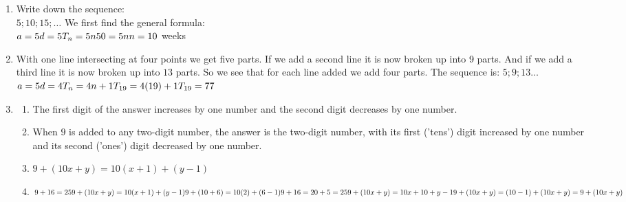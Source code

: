 \begin{eocsolutions}{}
{\begin{enumerate}[itemsep=5pt, label=\textbf{\arabic*}. ]
\begin{enumerate}[noitemsep, label=\textbf{(\alph*)} ]
  \item The first term is 4 since this is the number of matches needed for 1 square.
  \item The common difference between the terms is $3$. ($7 -4 = 3$ ; $10 - 7 = 3$)
  \item 
$%
T_n = 3n + 1$
  \item $T_25 = 3(25) + 1 \\
= 76$
  \end{enumerate}   
\item Write down the sequence:\\
$5 ; 10 ; 15 ; \ldots$
We first find the general formula:\\
$a = 5\\
d = 5\\
T_n = 5n  \\
50 = 5n \\
n = 10 $ weeks
\item With one line intersecting at four points we get five parts. If we add a second line it is now broken up into 9 parts. And if we add a third line it is now broken up into $13$ parts. So we see that for each line added we add four parts. The sequence is: $5 ; 9 ; 13 \ldots$\\
$a = 5\\
d = 4\\
T_n = 4n + 1  \\
T_{19} = 4(19) + 1 \\
T_{19} = 77 $
\item 
  \begin{enumerate}[noitemsep, label=\textbf{(\alph*)} ]
  \item The first digit of the answer increases by one number and the second digit decreases by one number.
  \item When $9$ is added to any two-digit number, the answer is the two-digit number, with its first ('tens') digit increased by one number and its second ('ones') digit decreased by one number.
  \item $9 + (10x + y) = 10(x+1)+(y-1)$
  \item $9 + 16 = 25\\
9 + (10x + y) = 10(x + 1) + (y-1)\\
9 + (10 + 6) = 10(2) + (6-1)\\
9 + 16 = 20 + 5 = 25\\
9 + (10x + y) = 10x + 10 + y - 1\\
9 + (10x + y) = (10 - 1) + (10x + y) 
= 9 + (10x + y)$
  \end{enumerate}
\end{enumerate}}
\end{eocsolutions}


